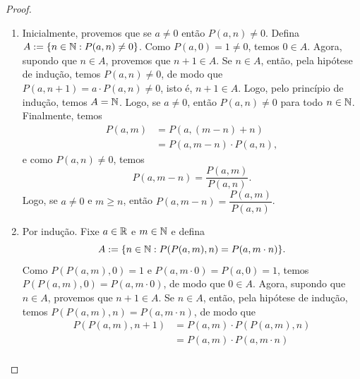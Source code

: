 \begin{proof}
\begin{enumerate}[leftmargin=*, align=left, label=\textbf{(\alph*)}]
\begin{enumerate}[label=\roman*.]
\begin{align*}
                            P(a,m+(n+1)) &= P(a,(m+n)+1) \\
                            &= a \cdot P(a,m+n) \\
                            &= a \cdot (P(a,m) \cdot P(a,n)) \\
                            &= P(a,m) \cdot (a \cdot P(a,n)) \\
                            &= P(a,m) \cdot P(a,n+1),
                        \end{align*}
                    isto é, $n+1 \in A$. Logo, pelo princípio de indução, temos $A = \N$. Logo, $P(a,m+n) = P(a,m) \cdot P(a,n)$, para quaisquer $a \in \R$ e $m,n \in \N$.
                    \item Inicialmente, provemos que se $a \neq 0$ então $P(a,n) \neq 0$. Defina $A := \{n \in \mathbb{N} : P(a,n) \neq 0\}$. Como $P(a,0) = 1 \neq 0$, temos $0 \in A$. Agora, supondo que $n \in A$, provemos que $n+1 \in A$. Se $n \in A$, então, pela hipótese de indução, temos $P(a,n) \neq 0$, de modo que $P(a,n+1) = a \cdot P(a,n) \neq 0$, isto é, $n+1 \in A$. Logo, pelo princípio de indução, temos $A = \N$. Logo, se $a \neq 0$, então $P(a,n) \neq 0$ para todo $n \in \mathbb{N}$. Finalmente, temos
                        \begin{align*}
                            P(a,m) &= P(a,(m-n)+n) \\
                            &= P(a,m-n) \cdot P(a,n),
                        \end{align*}
                    e como $P(a,n) \neq 0$, temos
                        \[
                            P(a,m-n) = \dfrac{P(a,m)}{P(a,n)}.
                        \]
                    Logo, se $a \neq 0$ e $m \geq n$, então $P(a,m-n) = \dfrac{P(a,m)}{P(a,n)}$.
                    \item Por indução. Fixe $a \in \R$ e $m \in \mathbb{N}$ e defina
                        \[
                            A := \{n \in \mathbb{N} : P(P(a,m),n) = P(a,m \cdot n)\}.
                        \]
                    Como $P(P(a,m),0) = 1$ e $P(a,m \cdot 0) = P(a,0) = 1$, temos $P(P(a,m),0) = P(a,m \cdot 0)$, de modo que $0 \in A$. Agora, supondo que $n \in A$, provemos que $n+1 \in A$. Se $n \in A$, então, pela hipótese de indução, temos $P(P(a,m),n) = P(a,m \cdot n)$, de modo que
                        \begin{align*}
                            P(P(a,m),n+1) &= P(a,m) \cdot P(P(a,m),n) \\
                            &= P(a,m) \cdot P(a,m \cdot n) \\

\end{align*}
\end{enumerate}
\end{enumerate}
\end{proof}
